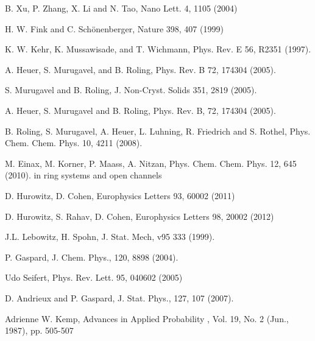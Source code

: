 \documentclass[aps,prl,floats,floatfix,twocolumn]{revtex4}
\begin{document}
\begin{thebibliography}{99}
B. Xu, P. Zhang, X. Li and N. Tao, Nano Lett. 4, 1105 (2004)

H. W. Fink and C. Sch\"onenberger, Nature 398, 407 (1999)


K. W. Kehr, K. Mussawisade, and T. Wichmann,
Phys. Rev. E 56, R2351 (1997).

A. Heuer, S. Murugavel, and B. Roling,
Phys. Rev. B 72, 174304 (2005).

S. Murugavel and B. Roling, 
J. Non-Cryst. Solids 351, 2819 (2005).

A. Heuer, S. Murugavel and B. Roling, 
Phys. Rev. B, 72, 174304 (2005).

B. Roling, S. Murugavel, A. Heuer, L. Luhning, R. Friedrich and S. Rothel, 
Phys. Chem. Chem. Phys. 10, 4211 (2008).

M. Einax, M. Korner, P. Maass, A. Nitzan,
Phys. Chem. Chem. Phys. 12, 645 (2010).
in ring systems and open channels


D. Hurowitz, D. Cohen,
Europhysics Letters 93, 60002 (2011) 


D. Hurowitz, S. Rahav, D. Cohen,
Europhysics Letters 98, 20002 (2012) 



J.L. Lebowitz, H. Spohn, J. Stat. Mech, v95 333 (1999).

P. Gaspard, J. Chem. Phys., 120, 8898 (2004).

Udo Seifert, %
Phys. Rev. Lett. 95, 040602 (2005)

D. Andrieux and P. Gaspard, J. Stat. Phys., 127, 107 (2007).




Adrienne W. Kemp,
Advances in Applied Probability , Vol. 19, No. 2 (Jun., 1987), pp. 505-507


\end{thebibliography}
\end{document}
